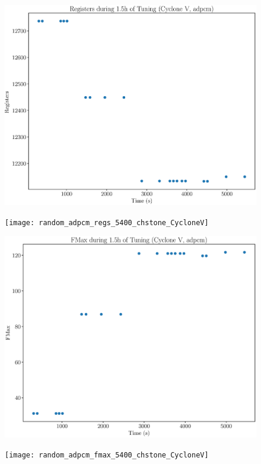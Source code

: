 \documentclass[12pt, a4paper]{article}
\begin{document}
\begin{figure}[htpb]
    \begin{minipage}{.48\textwidth}
        \includegraphics[scale=.25]{adpcm_regs_5400_chstone_CycloneV}
    \end{minipage}%
    \hfill
    \begin{minipage}{.48\textwidth}
        \texttt{[image: random\_adpcm\_regs\_5400\_chstone\_CycloneV]}
    \end{minipage}%

    \begin{minipage}{.48\textwidth}
        \includegraphics[scale=.25]{adpcm_fmax_5400_chstone_CycloneV}
    \end{minipage}%
    \hfill
    \begin{minipage}{.48\textwidth}
        \texttt{[image: random\_adpcm\_fmax\_5400\_chstone\_CycloneV]}
    \end{minipage}%
\end{figure}
\end{document}
